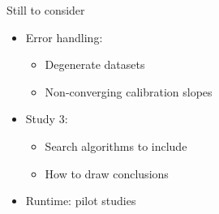 \documentclass[aspectratio=169]{beamer} %
\begin{document}
\begin{frame}{Still to consider}
    \begin{itemize}
        \item Error handling:\begin{itemize}
            \item Degenerate datasets
            \item Non-converging calibration slopes
        \end{itemize}
        \item Study 3:\begin{itemize}
            \item Search algorithms to include
            \item How to draw conclusions
        \end{itemize}
        \item Runtime: pilot studies
    \end{itemize}
\end{frame}
\end{document}
